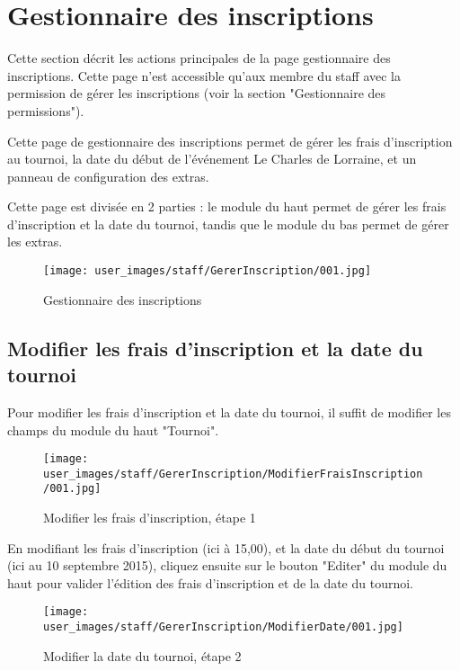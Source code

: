 \section{Gestionnaire des inscriptions}

Cette section décrit les actions principales de la page gestionnaire des inscriptions. Cette page n'est accessible qu'aux membre du staff avec la permission de gérer les inscriptions (voir la section "Gestionnaire des permissions").\newline

Cette page de gestionnaire des inscriptions permet de gérer les frais d'inscription au tournoi, la date du début de l'événement Le Charles de Lorraine, et un panneau de configuration des extras.\newline

Cette page est divisée en 2 parties : le module du haut permet de gérer les frais d'inscription et la date du tournoi, tandis que le module du bas permet de gérer les extras.

\begin{figure}[H]
\centering
\texttt{[image: user\_images/staff/GererInscription/001.jpg]}
\caption{Gestionnaire des inscriptions}
\end{figure}

\subsection{Modifier les frais d'inscription et la date du tournoi}

Pour modifier les frais d'inscription et la date du tournoi, il suffit de modifier les champs du module du haut "Tournoi".

\begin{figure}[H]
\centering
\texttt{[image: user\_images/staff/GererInscription/ModifierFraisInscription/001.jpg]}
\caption{Modifier les frais d'inscription, étape 1}
\end{figure}

En modifiant les frais d'inscription (ici à 15,00), et la date du début du tournoi (ici au 10 septembre 2015), cliquez ensuite sur le bouton "Editer" du module du haut pour valider l'édition des frais d'inscription et de la date du tournoi.

\begin{figure}[H]
\centering
\texttt{[image: user\_images/staff/GererInscription/ModifierDate/001.jpg]}
\caption{Modifier la date du tournoi, étape 2}
\end{figure}


